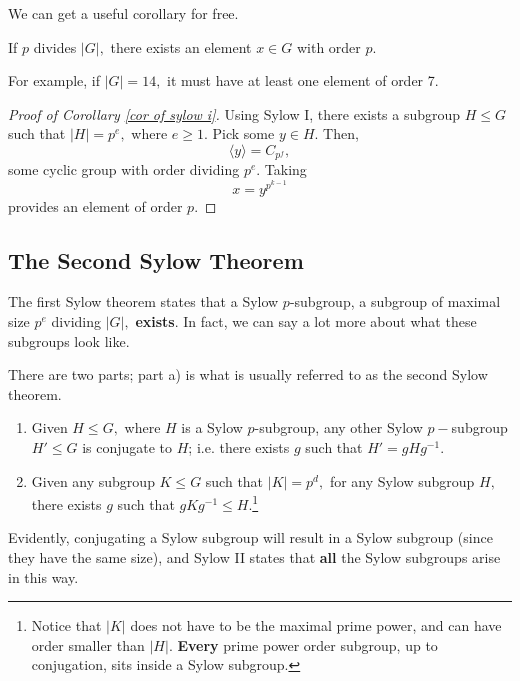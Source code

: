 We can get a useful corollary for free. 

\begin{corollary}\label{cor of sylow i}
If $p$ divides $|G|,$ there exists an element $x \in G$ with order $p.$
\end{corollary}

For example, if $|G| = 14,$ it must have at least one element of order 7.

\begin{proof}[Proof of Corollary \ref{cor of sylow i}]

Using Sylow I, there exists a subgroup $H \leq G$ such that $|H| = p^e,$ where $e \geq 1.$ Pick some $y \in H$. Then, \[\langle y \rangle = C_{p^f},\] some cyclic group with order dividing $p^e$. Taking \[x = y^{p^{k-1}}\] provides an element of order $p.$
\end{proof}

\subsection{The Second Sylow Theorem}

The first Sylow theorem states that a Sylow $p$-subgroup, a subgroup of maximal size $p^e$ dividing $|G|,$ \textbf{exists}. In fact, we can say a lot more about what these subgroups look like.  

\begin{theorem}[Sylow II]
There are two parts; part a) is what is usually referred to as the second Sylow theorem.

\begin{enumerate}[label = (\alph*)]
    \item Given $H \leq G,$ where $H$ is a Sylow $p$-subgroup, any other Sylow $p-$subgroup $H' \leq G$ is conjugate to $H$; i.e. there exists $g$ such that $H' = gHg^{-1}$.
    
    \item Given any subgroup $K \leq G$ such that $|K| = p^d,$ for any Sylow subgroup $H,$ there exists $g$ such that $gKg^{-1} \leq H.$\footnote{Notice that $|K|$ does not have to be the maximal prime power, and can have order smaller than $|H|.$ \textbf{Every} prime power order subgroup, up to conjugation, sits inside a Sylow subgroup.}
\end{enumerate}
\end{theorem}

Evidently, conjugating a Sylow subgroup will result in a Sylow subgroup (since they have the same size), and Sylow II states that \textbf{all} the Sylow subgroups arise in this way. 

